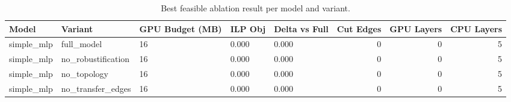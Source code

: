 \begin{table}[t]
\centering
\caption{Best feasible ablation result per model and variant.}
\label{tab:ilp-ablation-best-per-variant}
\begin{tabular}{lllllrrr}
\toprule
Model & Variant & GPU Budget (MB) & ILP Obj & Delta vs Full & Cut Edges & GPU Layers & CPU Layers \\
\midrule
simple_mlp & full_model & 16 & 0.000 & 0.000 & 0 & 0 & 5 \\
simple_mlp & no_robustification & 16 & 0.000 & 0.000 & 0 & 0 & 5 \\
simple_mlp & no_topology & 16 & 0.000 & 0.000 & 0 & 0 & 5 \\
simple_mlp & no_transfer_edges & 16 & 0.000 & 0.000 & 0 & 0 & 5 \\
\bottomrule
\end{tabular}

\end{table}
